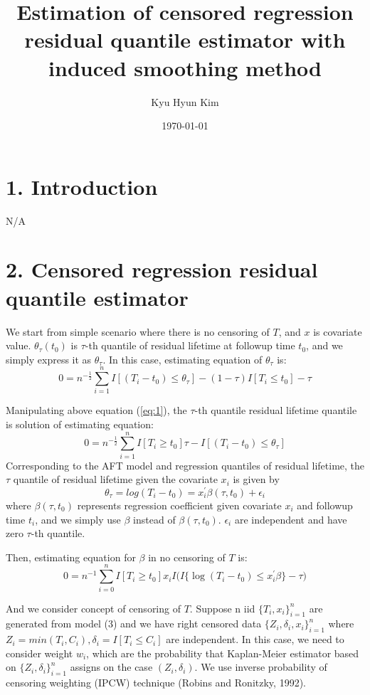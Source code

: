 \documentclass[12pt]{article}
\title{Estimation of censored regression residual quantile estimator with induced smoothing method}
\author{Kyu Hyun Kim}
\date{\today}
\begin{document}
	\maketitle
\section{1. Introduction}
	N/A
\section{2. Censored regression residual quantile estimator}
	We start from simple scenario where there is no censoring of $T$, and $x$ is covariate value.
	$\theta_{\tau}(t_0)$ is $\tau$-th quantile of residual lifetime at followup time $t_0$, and we simply express it as $\theta_{\tau}$. In this case, estimating equation of $\theta_{\tau}$ is:
	\begin{equation} \label{eq:1}
	0 = n^{-\frac{1}{2}}\sum_{i=1}^{n}I[(T_i-t_0)\leq\theta_{\tau}]-(1-\tau)I[T_i \leq t_0]-\tau
	\end{equation}
	
	Manipulating above equation (\ref{eq:1}), the $\tau$-th quantile residual lifetime quantile is solution of estimating equation:
	\begin{equation} \label{eq:2}
	0 = n^{-\frac{1}{2}}\sum_{i=1}^{n} I[T_i \ge t_0]{\tau - I[(T_i-t_0)\leq \theta_{\tau}]}
	\end{equation}
	Corresponding to the AFT model and regression quantiles of residual lifetime, the $\tau$ quantile of residual lifetime given the covariate $x_i$ is given by
	\begin{equation} \label{eq:3}
	\theta_{\tau}=log(T_i-t_0)=x_{i}^{\prime}\beta(\tau, t_0)+\epsilon_i
	\end{equation}
	where $\beta(\tau, t_0)$ represents regression coefficient given covariate $x_i$ and followup time $t_i$, and we simply use $\beta$ instead of $\beta(\tau, t_0)$. $\epsilon_i$ are independent and have zero $\tau$-th quantile.
	
	Then, estimating equation for $\beta$ in no censoring of $T$ is:
	\begin{equation} \label{eq:4}
	0 = n^{-1}\sum_{i=0}^{n}I[T_i \ge t_0] x_i I \Big(I\{\log(T_i - t_0) \leq x_i^{\prime}\beta\} - \tau \Big)
	\end{equation}
	
	And we consider concept of censoring of $T$. Suppose  n iid $\{T_i, x_i\}_{i=1}^{n}$ are generated from model (3) and we have right censored data $\{Z_i, \delta_i,x_i \}_{i=1}^{n}$ where $Z_i=min(T_i,C_i), \delta_i = I[T_i \leq C_i]$ are independent. In this case, we need to consider weight $w_i$, which are the probability that Kaplan-Meier estimator based on $\{Z_i, \delta_i \}_{i=1}^{n}$ assigns on the case $(Z_i, \delta_i)$. We use inverse probability of censoring weighting (IPCW) technique (Robins and Ronitzky, 1992).
	
\end{document}
